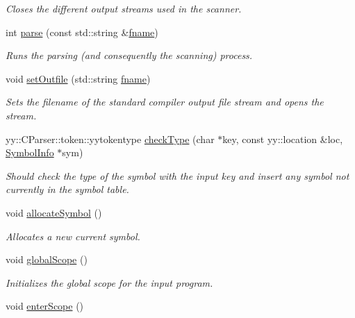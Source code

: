 \begin{DoxyCompactItemize}
\begin{DoxyCompactList}\small\item\em Closes the different output streams used in the scanner. \end{DoxyCompactList}\item 
int \hyperlink{classCCompiler_a8698733d7659aa1bc138b033a9b4d7fe}{parse} (const std\-::string \&\hyperlink{classCCompiler_a60b1cadb0db77e19be3b13e80ceade72}{fname})
\begin{DoxyCompactList}\small\item\em Runs the parsing (and consequently the scanning) process. \end{DoxyCompactList}\item 
void \hyperlink{classCCompiler_a66089b35f2d1676f4a6639080a4177c0}{set\-Outfile} (std\-::string \hyperlink{classCCompiler_a60b1cadb0db77e19be3b13e80ceade72}{fname})
\begin{DoxyCompactList}\small\item\em Sets the filename of the standard compiler output file stream and opens the stream. \end{DoxyCompactList}\item 
yy\-::\-C\-Parser\-::token\-::yytokentype \hyperlink{classCCompiler_ae37bb9232064de17552090db6a2df97d}{check\-Type} (char $\ast$key, const yy\-::location \&loc, \hyperlink{structSymbolInfo}{Symbol\-Info} $\ast$sym)
\begin{DoxyCompactList}\small\item\em Should check the type of the symbol with the input key and insert any symbol not currently in the symbol table. \end{DoxyCompactList}\item 
\hypertarget{classCCompiler_adf3afdb8d707e764cabcafcb7ac3d66d}{void \hyperlink{classCCompiler_adf3afdb8d707e764cabcafcb7ac3d66d}{allocate\-Symbol} ()}\label{classCCompiler_adf3afdb8d707e764cabcafcb7ac3d66d}

\begin{DoxyCompactList}\small\item\em Allocates a new current symbol. \end{DoxyCompactList}\item 
\hypertarget{classCCompiler_a46e2be0b3d3bc44ecfe0b054e94676ba}{void \hyperlink{classCCompiler_a46e2be0b3d3bc44ecfe0b054e94676ba}{global\-Scope} ()}\label{classCCompiler_a46e2be0b3d3bc44ecfe0b054e94676ba}

\begin{DoxyCompactList}\small\item\em Initializes the global scope for the input program. \end{DoxyCompactList}\item 
\hypertarget{classCCompiler_a907195dbe90c35f4aeec4be6616e3f34}{void \hyperlink{classCCompiler_a907195dbe90c35f4aeec4be6616e3f34}{enter\-Scope} ()}\label{classCCompiler_a907195dbe90c35f4aeec4be6616e3f34}


\end{DoxyCompactItemize}
